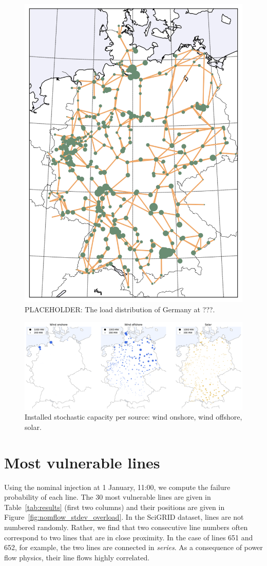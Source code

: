 \documentclass[main.tex]{subfiles}
\begin{document}
\begin{figure}
    \centering
    \includegraphics[width=.4\textwidth]{img/load.png}
    \caption{PLACEHOLDER: The load distribution of Germany at ???.}
    \label{fig:loaddistribution}
\end{figure}

\begin{figure}
    \centering
    \includegraphics[width=\textwidth]{img/installed_stochastic_capacity.pdf}
    \caption{Installed stochastic capacity per source: wind onshore, wind offshore, solar.}
    \label{fig:solarwind}
\end{figure}


\section{Most vulnerable lines}
Using the nominal injection at 1 January, 11:00, we compute the failure probability of each line. The 30 most vulnerable lines are given in Table~\ref{tab:results} (first two columns) and their positions are given in Figure~\ref{fig:nomflow_stdev_overload}. In the SciGRID dataset, lines are not numbered randomly. Rather, we find that two consecutive line numbers often correspond to two lines that are in close proximity. In the case of lines 651 and 652, for example, the two lines are connected in \emph{series}. As a consequence of power flow physics, their line flows highly correlated.
\end{document}
